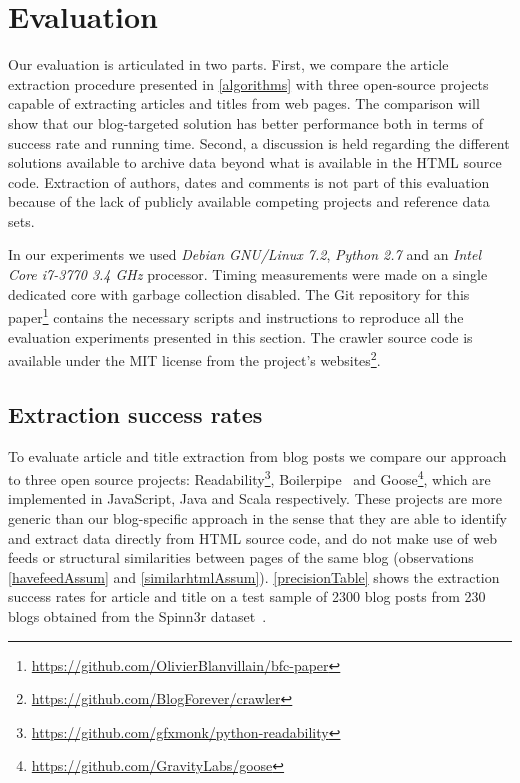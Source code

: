 \section{Evaluation}
\label{evaluation}

Our evaluation is articulated in two parts. First, we compare the article extraction procedure presented in \autoref{algorithms} with three open-source projects capable of extracting articles and titles from web pages. The comparison will show that our blog-targeted solution has better performance both in terms of success rate and running time. Second, a discussion is held regarding the different solutions available to archive data beyond what is available in the HTML source code. Extraction of authors, dates and comments is not part of this evaluation because of the lack of publicly available competing projects and reference data sets.

In our experiments we used \emph{Debian GNU/Linux 7.2}, \emph{Python 2.7} and an \emph{Intel Core i7-3770 3.4 GHz} processor. Timing measurements were made on a single dedicated core with garbage collection disabled. The Git repository for this paper\footnote{\url{https://github.com/OlivierBlanvillain/bfc-paper}} contains the necessary scripts and instructions to reproduce all the evaluation experiments presented in this section. The crawler source code is available under the MIT license from the project's websites\footnote{\url{https://github.com/BlogForever/crawler}}.

\subsection{Extraction success rates}
To evaluate article and title extraction from blog posts we compare our approach to three open source projects: Readability\footnote{\url{https://github.com/gfxmonk/python-readability}}, Boilerpipe~\cite{kohlschuetter2010} and Goose\footnote{\url{https://github.com/GravityLabs/goose}}, which are implemented in JavaScript, Java and Scala respectively. These projects are more generic than our blog-specific approach in the sense that they are able to identify and extract data directly from HTML source code, and do not make use of web feeds or structural similarities between pages of the same blog (observations \ref{havefeedAssum} and \ref{similarhtmlAssum}). \autoref{precisionTable} shows the extraction success rates for article and title on a test sample of 2300 blog posts from 230 blogs obtained from the Spinn3r dataset~\cite{burton2011}.

